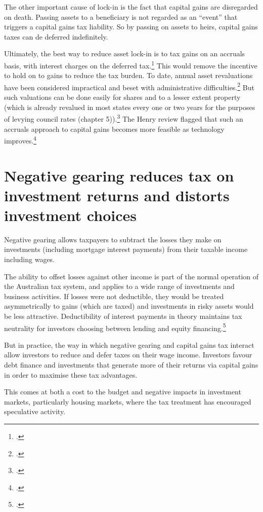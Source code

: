 \documentclass{grattan}\usepackage[]{graphicx}\usepackage[]{color}
\begin{document}
The other important cause of lock-in is the fact that capital gains are disregarded on death. Passing assets to a beneficiary is not regarded as an ``event'' that triggers a capital gains tax liability. So by passing on assets to heirs, capital gains taxes can de deferred indefinitely. 

Ultimately, the best way to reduce asset lock-in is to tax gains on an accruals basis, with interest charges on the deferred tax.\footcite[pp.~11-14]{Burman2009} This would remove the incentive to hold on to gains to reduce the tax burden. To date, annual asset revaluations have been considered impractical and beset with administrative difficulties.\footcites{OECD2006a}{Commission2004} But such valuations can be done easily for shares and to a lesser extent property (which is already revalued in most states every one or two years for the purposes of levying council rates (chapter 5)).\footcites{Burman2009}[p.~12]{Ingles2009} The Henry review flagged that such an accruals approach to capital gains becomes more feasible as technology improves.\footcite[p.~64]{Treasury2010} 


\section{Negative gearing reduces tax on investment returns and distorts investment choices }\label{sec:negative_gearing_provides}
Negative gearing allows taxpayers to subtract the losses they make on investments (including mortgage interest payments) from their taxable income including wages. 

The ability to offset losses against other income is part of the normal operation of the Australian tax system, and applies to a wide range of investments and business activities. If losses were not deductible, they would be treated asymmetrically to gains (which are taxed) and investments in risky assets would be less attractive. Deductibility of interest payments in theory maintains tax neutrality for investors choosing between lending and equity financing.\footcite{Fane2004}  

But in practice, the way in which negative gearing and capital gains tax interact allow investors to reduce and defer taxes on their wage income. Investors favour debt finance and investments that generate more of their returns via capital gains in order to maximise these tax advantages. 

This comes at both a cost to the budget and negative impacts in investment markets, particularly housing markets, where the tax treatment has encouraged speculative activity. 
\end{document}
